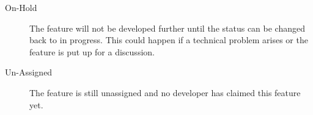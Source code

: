 \begin{description}
\begin{description}
\begin{description}
        \item[On-Hold] The feature will not be developed further until the
          status can be changed back to in progress. This could happen if a
          technical problem arises or the feature is put up for a discussion.

        \item[Un-Assigned] The feature is still unassigned and no developer has
          claimed this feature yet.

      \end{description}


  \end{description}

\end{description}


